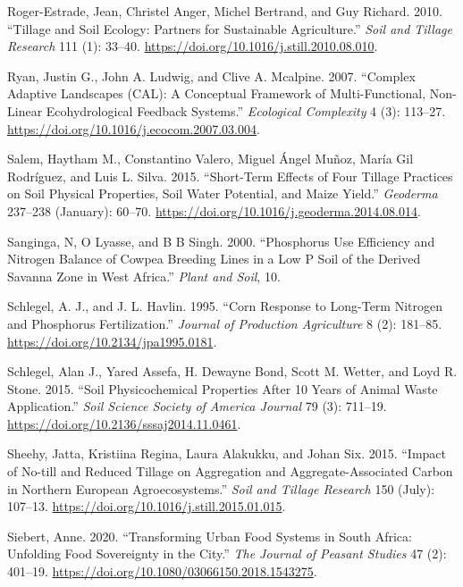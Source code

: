 \documentclass[
  12pt,
]{article}
\newlength{\cslhangindent}
\newlength{\cslentryspacingunit} %
\newenvironment{CSLReferences}[2] %
 {%
  \setlength{\parindent}{0pt}
  \ifodd #1
  \let\oldpar\par
  \def\par{\hangindent=\cslhangindent\oldpar}
  \fi
  \setlength{\parskip}{#2\cslentryspacingunit}
 }%
 {}
\begin{document}
\begin{CSLReferences}{1}{0}
\leavevmode{}%
Roger-Estrade, Jean, Christel Anger, Michel Bertrand, and Guy Richard. 2010. {``Tillage and Soil Ecology: {Partners} for Sustainable Agriculture.''} \emph{Soil and Tillage Research} 111 (1): 33--40. \url{https://doi.org/10.1016/j.still.2010.08.010}.

\leavevmode{}%
Ryan, Justin G., John A. Ludwig, and Clive A. Mcalpine. 2007. {``Complex Adaptive Landscapes ({CAL}): {A} Conceptual Framework of Multi-Functional, Non-Linear Ecohydrological Feedback Systems.''} \emph{Ecological Complexity} 4 (3): 113--27. \url{https://doi.org/10.1016/j.ecocom.2007.03.004}.

\leavevmode{}%
Salem, Haytham M., Constantino Valero, Miguel Ángel Muñoz, María Gil Rodríguez, and Luis L. Silva. 2015. {``Short-Term Effects of Four Tillage Practices on Soil Physical Properties, Soil Water Potential, and Maize Yield.''} \emph{Geoderma} 237--238 (January): 60--70. \url{https://doi.org/10.1016/j.geoderma.2014.08.014}.

\leavevmode{}%
Sanginga, N, O Lyasse, and B B Singh. 2000. {``Phosphorus Use Efficiency and Nitrogen Balance of Cowpea Breeding Lines in a Low {P} Soil of the Derived Savanna Zone in {West Africa}.''} \emph{Plant and Soil}, 10.

\leavevmode{}%
Schlegel, A. J., and J. L. Havlin. 1995. {``Corn {Response} to {Long-Term Nitrogen} and {Phosphorus Fertilization}.''} \emph{Journal of Production Agriculture} 8 (2): 181--85. \url{https://doi.org/10.2134/jpa1995.0181}.

\leavevmode{}%
Schlegel, Alan J., Yared Assefa, H. Dewayne Bond, Scott M. Wetter, and Loyd R. Stone. 2015. {``Soil {Physicochemical Properties} After 10 {Years} of {Animal Waste Application}.''} \emph{Soil Science Society of America Journal} 79 (3): 711--19. \url{https://doi.org/10.2136/sssaj2014.11.0461}.

\leavevmode{}%
Sheehy, Jatta, Kristiina Regina, Laura Alakukku, and Johan Six. 2015. {``Impact of No-till and Reduced Tillage on Aggregation and Aggregate-Associated Carbon in {Northern European} Agroecosystems.''} \emph{Soil and Tillage Research} 150 (July): 107--13. \url{https://doi.org/10.1016/j.still.2015.01.015}.

\leavevmode{}%
Siebert, Anne. 2020. {``Transforming Urban Food Systems in {South Africa}: Unfolding Food Sovereignty in the City.''} \emph{The Journal of Peasant Studies} 47 (2): 401--19. \url{https://doi.org/10.1080/03066150.2018.1543275}.


\end{CSLReferences}
\end{document}
